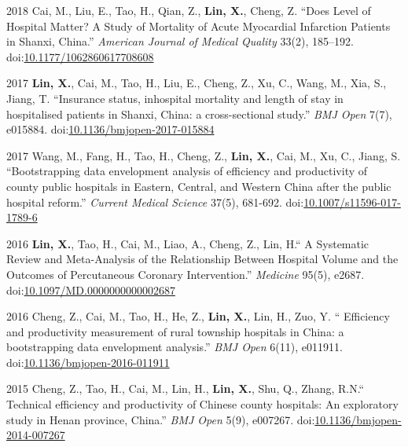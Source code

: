\documentclass[12pt,letterpaper]{report}
\begin{document}
\begin{tablist}
		\item[2018] \tab Cai, M., Liu, E., Tao, H., Qian, Z., \textbf{Lin, X.}, Cheng, Z. \enquote{Does Level of Hospital Matter? A Study of Mortality of Acute Myocardial Infarction Patients in Shanxi, China.} \textit{American Journal of Medical Quality}  33(2), 185–192. doi:\href{ https://doi.org/10.1177/1062860617708608}{10.1177/1062860617708608}
		
		\item[2017] \tab  \textbf{Lin, X.}, Cai, M., Tao, H., Liu, E., Cheng, Z., Xu, C., Wang, M., Xia, S., Jiang, T. \enquote{Insurance status, inhospital mortality and length of stay in hospitalised patients in Shanxi, China: a cross-sectional study.} \textit{BMJ Open}  7(7), e015884. doi:\href{ https://doi.org/10.1136/bmjopen-2017-015884}{10.1136/bmjopen-2017-015884}
		   
		\item[2017] \tab Wang, M., Fang, H., Tao, H., Cheng, Z., \textbf{Lin, X.}, Cai, M., Xu, C., Jiang, S. \enquote{Bootstrapping data envelopment analysis of efficiency and productivity of county public hospitals in Eastern, Central, and Western China after the public hospital reform.} \textit{Current Medical Science}  37(5), 681-692. doi:\href{ https://doi.org/10.1007/s11596-017-1789-6}{10.1007/s11596-017-1789-6}
    	 
		\item[2016] \tab \textbf{Lin, X.}, Tao, H., Cai, M., Liao, A., Cheng, Z., Lin, H.\enquote{ A Systematic Review and Meta-Analysis of the Relationship Between Hospital Volume and the Outcomes of Percutaneous Coronary Intervention.} \textit{Medicine}  95(5), e2687. doi:\href{ https://doi.org/10.1097/MD.0000000000002687}{10.1097/MD.0000000000002687}
				
		\item[2016] \tab Cheng, Z., Cai, M., Tao, H., He, Z., \textbf{Lin, X.}, Lin, H., Zuo, Y. \enquote{ Efficiency and productivity measurement of rural township hospitals in China: a bootstrapping data envelopment analysis.} \textit{BMJ Open}  6(11), e011911. doi:\href{ https://doi.org/10.1136/bmjopen-2016-011911}{10.1136/bmjopen-2016-011911}
		
		\item[2015] \tab Cheng, Z., Tao, H., Cai, M., Lin, H., \textbf{Lin, X.}, Shu, Q., Zhang, R.N.\enquote{ Technical efficiency and productivity of Chinese county hospitals: An exploratory study in Henan province, China.} \textit{BMJ Open}  5(9), e007267. doi:\href{ https://doi.org/10.1136/bmjopen-2014-007267}{10.1136/bmjopen-2014-007267}

 \end{tablist}
\end{document}
